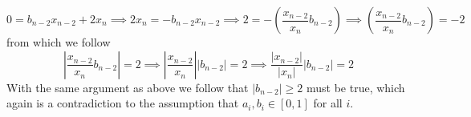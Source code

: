 \documentclass{article}
\begin{document}
\begin{equation*}
   0 = b_{n-2}x_{n-2} + 2x_{n}\implies 2x_{n} = -b_{n-2}x_{n-2} \implies  2 = -\left(\frac{x_{n-2}}{x_{n}}b_{n-2}\right) \implies \left(\frac{x_{n-2}}{x_{n}}b_{n-2}\right) = -2
\end{equation*}
from which we follow
\begin{equation*}
    \left\lvert\frac{x_{n-2}}{x_{n}}b_{n-2}\right\rvert = 2 \implies \left\lvert \frac{x_{n-2}}{x_{n}}\right\rvert \left\lvert b_{n-2}\right\rvert = 2 \implies  \frac{\left\lvert x_{n-2}\right\rvert}{\left\lvert x_{n}\right\rvert} \left\lvert b_{n-2}\right\rvert = 2 
\end{equation*}
With the same argument as above we follow that $\left\lvert b_{n-2}\right\rvert \geq 2$ must be true, which again is a contradiction to the assumption that $a_{i}, b_{i} \in \left[0,1\right]$ for all $i$.

\pagebreak 
\end{document}
